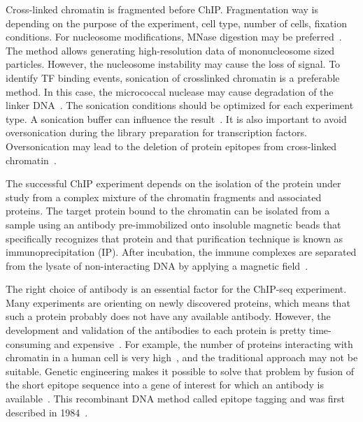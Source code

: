 Cross-linked chromatin is fragmented before ChIP. 
Fragmentation way is depending on the purpose of the experiment, cell type, number of cells, fixation conditions. 
For nucleosome modifications, MNase digestion may be preferred~\cite{kidder2011chip}.  
The method allows generating high-resolution data of mononucleosome sized particles. 
However, the nucleosome instability may cause the loss of signal.
To identify TF binding events, sonication of crosslinked chromatin is a preferable method. 
In this case, the micrococcal nuclease may cause degradation of the linker DNA~\cite{kidder2011chip}.
The sonication conditions should be optimized for each experiment type. 
A sonication buffer can influence the result~\cite{steger2008dot1l}. 
It is also important to avoid oversonication during the library preparation for transcription factors. 
Oversonication may lead to the deletion of protein epitopes from cross-linked chromatin~\cite{ostrow2015chip}. 



The successful ChIP experiment depends on the isolation of the protein under study from a complex mixture of the chromatin fragments and associated proteins. 
The target protein bound to the chromatin can be isolated from a sample using an antibody pre-immobilized onto insoluble magnetic beads that specifically recognizes that protein and that purification technique is known as immunoprecipitation (IP). 
After incubation, the immune complexes are separated from the lysate of non-interacting DNA by applying a magnetic field~\cite{slovakova2005use}.

The right choice of antibody is an essential factor for the ChIP-seq experiment. 
Many experiments are orienting on newly discovered proteins, which means that such a protein probably does not have any available antibody. 
However, the development and validation of the antibodies to each protein is pretty time-consuming and expensive~\cite{jarvik1998epitope}. 
For example, the number of proteins interacting with chromatin in a human cell is very high~\cite{ramani2005consolidating}, and the traditional approach may not be suitable.
Genetic engineering makes it possible to solve that problem by fusion of the short epitope sequence into a gene of interest for which an antibody is available~\cite{jarvik1998epitope,brizzard2008epitope,goldberg2010distinct}. 
This recombinant DNA method called epitope tagging and was first described in 1984~\cite{munro1984use}. 

